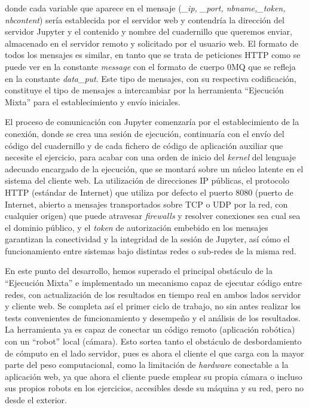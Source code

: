 donde cada variable que aparece en el mensaje (\textit{\_ip, \_port, nbname,\_token, nbcontent}) sería establecida por el servidor web y contendría la dirección del servidor Jupyter y el contenido y nombre del cuadernillo que queremos enviar, almacenado en el servidor remoto y solicitado por el usuario web. El formato de todos los mensajes es similar, en tanto que se trata de peticiones HTTP como se puede ver en la constante \textit{message} con el formato de cuerpo 0MQ que se refleja en la constante \textit{data\_put}. Este tipo de mensajes, con su respectiva codificación, constituye el tipo de mensajes a intercambiar por la herramienta ``Ejecución Mixta'' para el establecimiento y envío iniciales.

El proceso de comunicación con Jupyter comenzaría por el establecimiento de la conexión, donde se crea una sesión de ejecución, continuaría con el envío del código del cuadernillo y de cada fichero de código de aplicación auxiliar que necesite el ejercicio, para acabar con una orden de inicio del \textit{kernel} del lenguaje adecuado encargado de la ejecución, que se montará sobre un núcleo latente en el sistema del cliente web. La utilización de direcciones IP públicas, el protocolo HTTP (estándar de Internet) que utiliza por defecto el puerto 8080 (puerto de Internet, abierto a mensajes transportados sobre TCP o UDP por la red, con cualquier origen) que puede atravesar \textit{firewalls} y resolver conexiones sea cual sea el dominio público, y el \textit{token} de autorización embebido en los mensajes garantizan la conectividad y la integridad de la sesión de Jupyter, así cómo el funcionamiento entre sistemas bajo distintas redes o sub-redes de la misma red.

En este punto del desarrollo, hemos superado el principal obstáculo de la ``Ejecución Mixta'' e implementado un mecanismo capaz de ejecutar código entre redes, con actualización de los resultados en tiempo real en ambos lados servidor  y cliente web. Se completa así el primer ciclo de trabajo, no sin antes realizar los tests convenientes de funcionamiento y desempeño y el análisis de los resultados. La herramienta ya es capaz de conectar un código remoto (aplicación robótica) con un ``robot'' local (cámara). Esto sortea tanto el obstáculo de desbordamiento de cómputo en el lado servidor, pues es ahora el cliente el que carga con la mayor parte del peso computacional, como la limitación de \textit{hardware} conectable a la aplicación web, ya que ahora el cliente puede emplear su propia cámara o incluso sus propios robots en los ejercicios, accesibles desde su máquina y su red, pero no desde el exterior.


